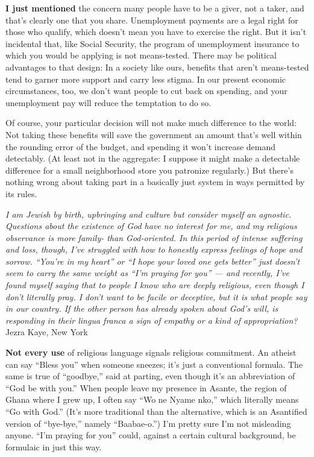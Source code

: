 \textbf{I just mentioned} the concern many people have to be a giver,
not a taker, and that's clearly one that you share. Unemployment
payments are a legal right for those who qualify, which doesn't mean you
have to exercise the right. But it isn't incidental that, like Social
Security, the program of unemployment insurance to which you would be
applying is not means-tested. There may be political advantages to that
design: In a society like ours, benefits that aren't means-tested tend
to garner more support and carry less stigma. In our present economic
circumstances, too, we don't want people to cut back on spending, and
your unemployment pay will reduce the temptation to do so.

Of course, your particular decision will not make much difference to the
world: Not taking these benefits will save the government an amount
that's well within the rounding error of the budget, and spending it
won't increase demand detectably. (At least not in the aggregate: I
suppose it might make a detectable difference for a small neighborhood
store you patronize regularly.) But there's nothing wrong about taking
part in a basically just system in ways permitted by its rules.

\emph{I am Jewish by birth, upbringing and culture but consider myself
an agnostic. Questions about the existence of God have no interest for
me, and my religious observance is more family- than God-oriented. In
this period of intense suffering and loss, though, I've struggled with
how to honestly express feelings of hope and sorrow. ``You're in my
heart'' or ``I hope your loved one gets better'' just doesn't seem to
carry the same weight as ``I'm praying for you'' --- and recently, I've
found myself saying that to people I know who are deeply religious, even
though I don't literally pray. I don't want to be facile or deceptive,
but it is what people say in our country. If the other person has
already spoken about God's will, is responding in their lingua franca a
sign of empathy or a kind of appropriation?} Jezra Kaye, New York

\textbf{Not every use} of religious language signals religious
commitment. An atheist can say ``Bless you'' when someone sneezes; it's
just a conventional formula. The same is true of ``goodbye,'' said at
parting, even though it's an abbreviation of ``God be with you.'' When
people leave my presence in Asante, the region of Ghana where I grew up,
I often say ``Wo ne Nyame nko,'' which literally means ``Go with God.''
(It's more traditional than the alternative, which is an Asantified
version of ``bye-bye,'' namely ``Baabae-o.'') I'm pretty sure I'm not
misleading anyone. ``I'm praying for you'' could, against a certain
cultural background, be formulaic in just this way.

